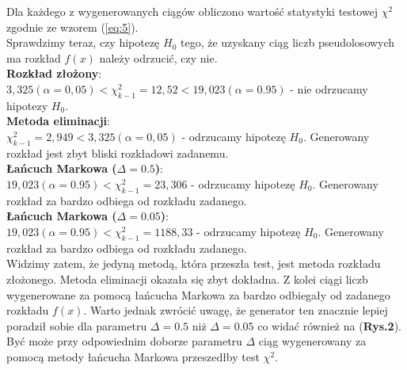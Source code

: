 \documentclass[a4paper,12pt,twoside]{article}
\begin{document}
\newpage

Dla każdego z wygenerowanych ciągów obliczono wartość statystyki testowej $\chi^2$ zgodnie ze wzorem (\ref{eq:5}). \\

Sprawdzimy teraz, czy hipotezę $H_0$ tego, że uzyskany ciąg liczb pseudolosowych ma rozkład $f(x)$ należy odrzucić, czy nie. \\

\textbf{Rozkład złożony}:\\
$3,325 (\alpha = 0,05) < \chi^2_{k-1} = 12,52 < 19,023 (\alpha = 0.95)$ - nie odrzucamy hipotezy $H_0$. \\


\textbf{Metoda eliminacji}:\\
 $ \chi^2_{k-1} = 2,949 < 3,325 (\alpha = 0,05)  $ - odrzucamy hipotezę $H_0$. Generowany rozkład jest zbyt bliski rozkładowi zadanemu.\\

\textbf{Łańcuch Markowa ($\Delta = 0.5$)}:\\
$19,023 (\alpha = 0.95) < \chi^2_{k-1} = 23,306$ - odrzucamy hipotezę $H_0$. Generowany rozkład za bardzo odbiega od rozkładu zadanego.\\

\textbf{Łańcuch Markowa ($\Delta = 0.05$)}:\\
$19,023 (\alpha = 0.95) < \chi^2_{k-1} = 1188,33$ - odrzucamy hipotezę $H_0$. Generowany rozkład za bardzo odbiega od rozkładu zadanego. \\

Widzimy zatem, że jedyną metodą, która przeszła test, jest metoda rozkładu złożonego. Metoda eliminacji okazała się zbyt dokładna. Z kolei ciągi liczb wygenerowane za pomocą łańcucha Markowa za bardzo odbiegały od zadanego rozkładu $f(x)$. Warto jednak zwrócić uwagę, że generator ten znacznie lepiej poradził sobie dla parametru $\Delta = 0.5$ niż $\Delta = 0.05$ co widać również na (\textbf{Rys.2}). Być może przy odpowiednim doborze parametru $\Delta$ ciąg wygenerowany za pomocą metody łańcucha Markowa przeszedłby test $\chi^2$.
 
 
\end{document}
